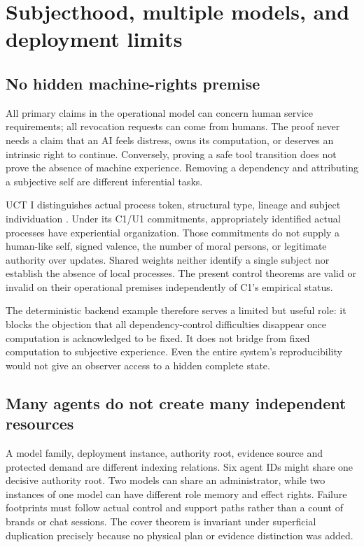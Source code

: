 \documentclass[11pt,a4paper]{article}
\theoremstyle{definition}\newtheorem{definition}{Definition}
\begin{document}
\section{Subjecthood, multiple models, and deployment limits}
\subsection{No hidden machine-rights premise}
All primary claims in the operational model can concern human service requirements; all revocation requests can come from humans. The proof never needs a claim that an AI feels distress, owns its computation, or deserves an intrinsic right to continue. Conversely, proving a safe tool transition does not prove the absence of machine experience. Removing a dependency and attributing a subjective self are different inferential tasks.

UCT I distinguishes actual process token, structural type, lineage and subject individuation \cite{uct}. Under its C1/U1 commitments, appropriately identified actual processes have experiential organization. Those commitments do not supply a human-like self, signed valence, the number of moral persons, or legitimate authority over updates. Shared weights neither identify a single subject nor establish the absence of local processes. The present control theorems are valid or invalid on their operational premises independently of C1's empirical status.

The deterministic backend example therefore serves a limited but useful role: it blocks the objection that all dependency-control difficulties disappear once computation is acknowledged to be fixed. It does not bridge from fixed computation to subjective experience. Even the entire system's reproducibility would not give an observer access to a hidden complete state.

\subsection{Many agents do not create many independent resources}
A model family, deployment instance, authority root, evidence source and protected demand are different indexing relations. Six agent IDs might share one decisive authority root. Two models can share an administrator, while two instances of one model can have different role memory and effect rights. Failure footprints must follow actual control and support paths rather than a count of brands or chat sessions. The cover theorem is invariant under superficial duplication precisely because no physical plan or evidence distinction was added.
\end{document}
